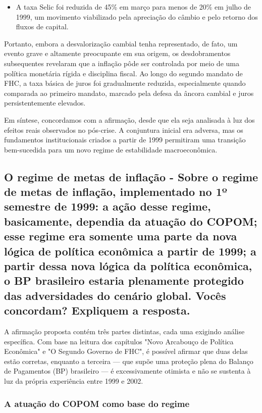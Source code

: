 \documentclass[a4paper,12pt]{article}[abntex2]
\begin{document}
\begin{itemize}
    \item A taxa Selic foi reduzida de 45\% em março para menos de 20\% em julho de 1999, um movimento viabilizado pela apreciação do câmbio e pelo retorno dos fluxos de capital.
\end{itemize}

Portanto, embora a desvalorização cambial tenha representado, de fato, um evento grave e altamente preocupante em sua origem, os desdobramentos subsequentes revelaram que a inflação pôde ser controlada por meio de uma política monetária rígida e disciplina fiscal. Ao longo do segundo mandato de FHC, a taxa básica de juros foi gradualmente reduzida, especialmente quando comparada ao primeiro mandato, marcado pela defesa da âncora cambial e juros persistentemente elevados.

Em síntese, concordamos com a afirmação, desde que ela seja analisada à luz dos efeitos reais observados no pós-crise. A conjuntura inicial era adversa, mas os fundamentos institucionais criados a partir de 1999 permitiram uma transição bem-sucedida para um novo regime de estabilidade macroeconômica.

\subsection{\textbf{O regime de metas de inflação - Sobre o regime de metas de inflação, implementado no 1º semestre de 1999: a ação desse regime, basicamente, dependia da atuação do COPOM; esse regime era somente uma parte da nova lógica de política econômica a partir de 1999; a partir dessa nova lógica da política econômica, o BP brasileiro estaria plenamente protegido das adversidades do cenário global. Vocês concordam? Expliquem a resposta.}}

A afirmação proposta contém três partes distintas, cada uma exigindo análise específica. Com base na leitura dos capítulos "Novo Arcabouço de Política Econômica" e "O Segundo Governo de FHC", é possível afirmar que duas delas estão corretas, enquanto a terceira — que supõe uma proteção plena do Balanço de Pagamentos (BP) brasileiro — é excessivamente otimista e não se sustenta à luz da própria experiência entre 1999 e 2002.

\subsubsection{\textbf{A atuação do COPOM como base do regime}}
\end{document}
